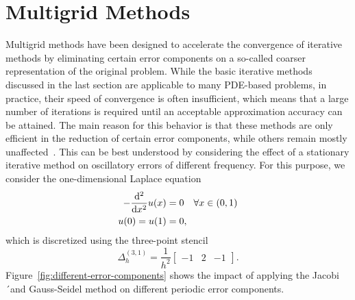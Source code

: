 \section{Multigrid Methods}
Multigrid methods have been designed to accelerate the convergence of iterative methods by eliminating certain error components on a so-called coarser representation of the original problem.
While the basic iterative methods discussed in the last section are applicable to many PDE-based problems, in practice, their speed of convergence is often insufficient, which means that a large number of iterations is required until an acceptable approximation accuracy can be attained. 
The main reason for this behavior is that these methods are only efficient in the reduction of certain error components, while others remain mostly unaffected~\cite{briggs2000multigrid}.
This can be best understood by considering the effect of a stationary iterative method on oscillatory errors of different frequency.
For this purpose, we consider the one-dimensional Laplace equation
\begin{equation}
		\begin{split}
			- \dv[2]{x} u(x) & = 0 \quad \forall x \in (0, 1) \\
			u(0) = u(1) & = 0,
		\end{split}
		\label{eq:1D-laplace-model}
\end{equation}
which is discretized using the three-point stencil
\begin{equation}
	\Delta_h^{(3, 1)} = \frac{1}{h^2}\begin{bmatrix}
		-1 & 2 & -1
	\end{bmatrix}.
		\label{eq:1D-laplace-stencil}
\end{equation} 
Figure~\ref{fig:different-error-components} shows the impact of applying the Jacobi´and Gauss-Seidel method on different periodic error components.
